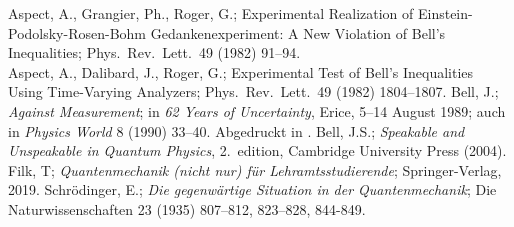 \begin{thebibliography}{99}
 Aspect, A., Grangier, Ph., Roger, G.; 
       {Experimental Realization of Einstein-Podolsky-Rosen-Bohm 
        Gedankenexperiment: A New Violation of Bell's Inequalities}; 
        Phys.\ Rev.\ Lett.\ 49 (1982) 91--94. \\
        Aspect, A., Dalibard, J., Roger, G.; {Experimental Test 
        of Bell's Inequalities Using Time-Varying Analyzers}; 
        Phys.\ Rev.\ Lett.\ 49 (1982) 1804--1807.
 Bell, J.; {\em Against \glq Measurement\grq};
        in {\em 62 Years of Uncertainty}, Erice, 5--14 August 1989;
        auch in {\em Physics World} 8 (1990) 33--40. Abgedruckt in
        \cite{Bell2}. 
 Bell, J.S.;  {\em Speakable and Unspeakable in 
        Quantum Physics}, 2.\ edition, Cambridge University Press (2004).         
         Filk, T; \textit{Quantenmechanik (nicht nur) f\"ur Lehramtsstudierende}; Springer-Verlag, 2019.
 Schr\"odinger, E.; {\em Die gegenw\"artige
        Situation in der Quantenmechanik}; Die Naturwissenschaften 23
        (1935) 807--812, 823--828,  844-849.      
\end{thebibliography}

%

